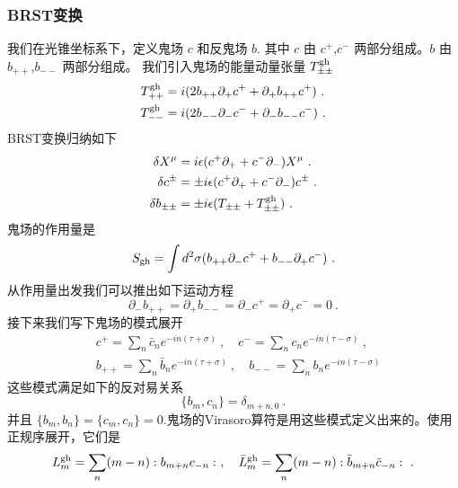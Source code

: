 \subsubsection{BRST变换}
我们在光锥坐标系下，定义鬼场 $c$ 和反鬼场 $b$. 其中 $c$ 由 $c^+$,$c^-$ 两部分组成。$b$ 由 $b_{++}$,$b_{--}$ 两部分组成。 我们引入鬼场的能量动量张量 $T^{\rm gh}_{\pm\pm}$
\begin{equation}
\begin{aligned}
T^{\rm gh}_{++} &  = i (2 b_{++}\partial_+ c^+ +\partial_+ b_{++}c^+)~. \\
T^{\rm gh}_{--} &  = i (2 b_{--}\partial_- c^- +\partial_- b_{--}c^-)~.
\end{aligned}
\end{equation}
BRST变换归纳如下
\begin{equation}
\begin{aligned}
\delta X^\mu & = i \epsilon (c^+\partial_+ + c^- \partial_- ) X^\mu~. \\
\delta c^{\pm} & = \pm i \epsilon (c^+\partial_++c^-\partial_-) c^{\pm} ~. \\
\delta b_{\pm\pm} & = \pm i \epsilon (T_{\pm\pm} +T^{\rm gh}_{\pm\pm})~. 
\end{aligned}
\end{equation}
鬼场的作用量是
\begin{equation}
S_{\rm gh} = \int d^2\sigma (b_{++} \partial_- c^+ + b_{--} \partial_+ c^- ) ~.
\end{equation}
从作用量出发我们可以推出如下运动方程
\begin{equation}
\partial_- b_{++} = \partial_+ b_{--} = \partial_- c^+  = \partial_+ c^- = 0~.
\end{equation}
接下来我们写下鬼场的模式展开
\begin{equation}
\begin{aligned}
& c^+ = \sum_n \bar c_n e^{-i n (\tau+\sigma)} ~, \quad c^- = \sum_n c_n e^{-in(\tau-\sigma)} ~, \\
& b_{++} = \sum_n \bar b_n e^{-i n (\tau+\sigma)}~, \quad b_{--} = \sum_n b_n e^{-in(\tau-\sigma)}
\end{aligned}
\end{equation}
这些模式满足如下的反对易关系
\begin{equation}
\{b_m,c_n\} = \delta_{m+n,0}~.
\end{equation}
并且 $\{b_m,b_n\}=\{c_m,c_n\}=0$.鬼场的Virasoro算符是用这些模式定义出来的。使用正规序展开，它们是
\begin{equation}
L_m^{\rm gh} = \sum_n (m-n):b_{m+n}c_{-n}:~, \quad \bar L_m^{\rm gh} = \sum_n (m-n) :\bar b_{m+n}\bar c_{-n}:~. 
\end{equation}
